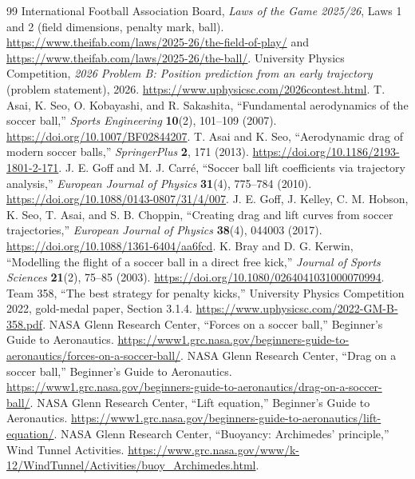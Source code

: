 \documentclass[11pt,a4paper]{article}
\begin{document}
\begin{thebibliography}{99}
 International Football Association Board, \emph{Laws of the Game 2025/26}, Laws 1 and 2 (field dimensions, penalty mark, ball). \url{https://www.theifab.com/laws/2025-26/the-field-of-play/} and \url{https://www.theifab.com/laws/2025-26/the-ball/}.
 University Physics Competition, \emph{2026 Problem B: Position prediction from an early trajectory} (problem statement), 2026. \url{https://www.uphysicsc.com/2026contest.html}.
 T. Asai, K. Seo, O. Kobayashi, and R. Sakashita, ``Fundamental aerodynamics of the soccer ball,'' \emph{Sports Engineering} \textbf{10}(2), 101--109 (2007). \url{https://doi.org/10.1007/BF02844207}.
 T. Asai and K. Seo, ``Aerodynamic drag of modern soccer balls,'' \emph{SpringerPlus} \textbf{2}, 171 (2013). \url{https://doi.org/10.1186/2193-1801-2-171}.
 J. E. Goff and M. J. Carr\'e, ``Soccer ball lift coefficients via trajectory analysis,'' \emph{European Journal of Physics} \textbf{31}(4), 775--784 (2010). \url{https://doi.org/10.1088/0143-0807/31/4/007}.
 J. E. Goff, J. Kelley, C. M. Hobson, K. Seo, T. Asai, and S. B. Choppin, ``Creating drag and lift curves from soccer trajectories,'' \emph{European Journal of Physics} \textbf{38}(4), 044003 (2017). \url{https://doi.org/10.1088/1361-6404/aa6fcd}.
 K. Bray and D. G. Kerwin, ``Modelling the flight of a soccer ball in a direct free kick,'' \emph{Journal of Sports Sciences} \textbf{21}(2), 75--85 (2003). \url{https://doi.org/10.1080/0264041031000070994}.
 Team 358, ``The best strategy for penalty kicks,'' University Physics Competition 2022, gold-medal paper, Section 3.1.4. \url{https://www.uphysicsc.com/2022-GM-B-358.pdf}.
 NASA Glenn Research Center, ``Forces on a soccer ball,'' Beginner's Guide to Aeronautics. \url{https://www1.grc.nasa.gov/beginners-guide-to-aeronautics/forces-on-a-soccer-ball/}.
 NASA Glenn Research Center, ``Drag on a soccer ball,'' Beginner's Guide to Aeronautics. \url{https://www1.grc.nasa.gov/beginners-guide-to-aeronautics/drag-on-a-soccer-ball/}.
 NASA Glenn Research Center, ``Lift equation,'' Beginner's Guide to Aeronautics. \url{https://www1.grc.nasa.gov/beginners-guide-to-aeronautics/lift-equation/}.
 NASA Glenn Research Center, ``Buoyancy: Archimedes' principle,'' Wind Tunnel Activities. \url{https://www.grc.nasa.gov/www/k-12/WindTunnel/Activities/buoy_Archimedes.html}.

\end{thebibliography}
\end{document}
